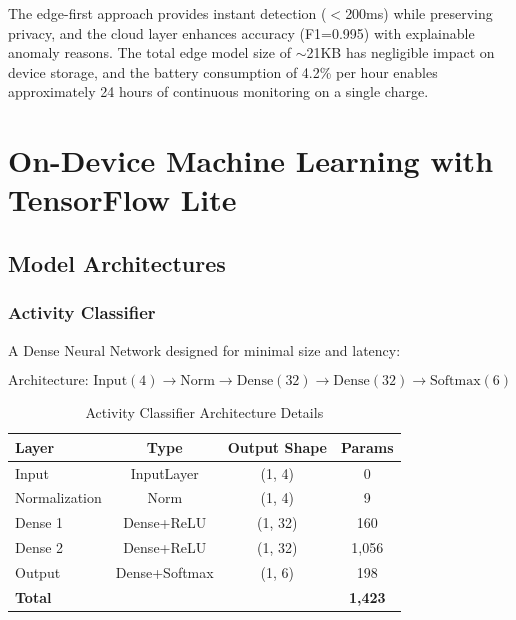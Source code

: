 \documentclass[conference]{IEEEtran}
\begin{document}
The edge-first approach provides instant detection ($<$200ms) while preserving privacy, and the cloud layer enhances accuracy (F1=0.995) with explainable anomaly reasons. The total edge model size of $\sim$21KB has negligible impact on device storage, and the battery consumption of 4.2\% per hour enables approximately 24 hours of continuous monitoring on a single charge.



\section{On-Device Machine Learning with TensorFlow Lite}

\subsection{Model Architectures}

\subsubsection{Activity Classifier}
A Dense Neural Network designed for minimal size and latency:

\begin{equation}
\text{Architecture: } \text{Input}(4) \rightarrow \text{Norm} \rightarrow \text{Dense}(32) \rightarrow \text{Dense}(32) \rightarrow \text{Softmax}(6)
\end{equation}

\begin{table}[H]
\centering
\caption{Activity Classifier Architecture Details}
\label{tab:activity_arch}
\begin{tabular}{lccc}
\toprule
\textbf{Layer} & \textbf{Type} & \textbf{Output Shape} & \textbf{Params} \\
\midrule
Input & InputLayer & (1, 4) & 0 \\
Normalization & Norm & (1, 4) & 9 \\
Dense 1 & Dense+ReLU & (1, 32) & 160 \\
Dense 2 & Dense+ReLU & (1, 32) & 1,056 \\
Output & Dense+Softmax & (1, 6) & 198 \\
\midrule
\textbf{Total} & & & \textbf{1,423} \\
\bottomrule
\end{tabular}
\end{table}
\end{document}
